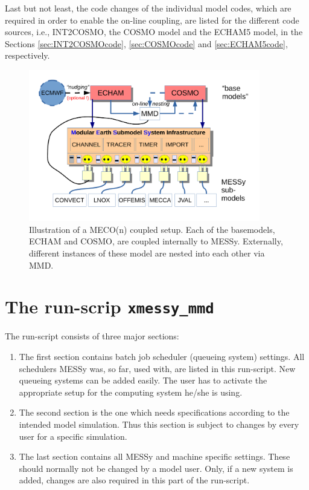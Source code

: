 \documentclass[11pt,twoside]{article}
\begin{document}
Last but not least, the code changes of the individual model codes,
which are required in order to enable the on-line coupling, are listed for
the different code sources, i.e., INT2COSMO, the COSMO model and the ECHAM5 
model, in the Sections \ref{sec:INT2COSMOcode}, \ref{sec:COSMOcode} and 
\ref{sec:ECHAM5code}, respectively.
\begin{figure}
\begin{center} 
\vspace{-.3cm}
\includegraphics[width=0.9\textwidth]{MECOn_coupling_stecker.pdf} 
\end{center} 
\vspace{-.8cm}
\caption{Illustration of a MECO(n) coupled setup. Each of the
basemodels, ECHAM and COSMO, are coupled internally to MESSy. Externally, 
different instances of these model are nested into each other via MMD.} 
\label{fig:MECOnflux} 
\end{figure} 

\clearpage


\section{The run-scrip \tt xmessy\_mmd}\label{sec:runscript}
The run-script consists of three major sections:
\begin{enumerate}
\item The first section contains batch job scheduler (queueing system)
settings. All schedulers 
MESSy was, so far, used with, are listed in this run-script. New 
queueing systems can be added easily. The user has to activate the appropriate
setup for the computing system he/she is using.
\item The second section is the one which needs specifications according to the 
intended model simulation. Thus this section is subject to changes by every user
for a specific simulation.
\item The last section contains all MESSy and machine specific settings.
These should normally not be changed by a model user. Only, if a new
 system is added, 
 changes are also required in this part of the run-script.
\end{enumerate}
\end{document}
